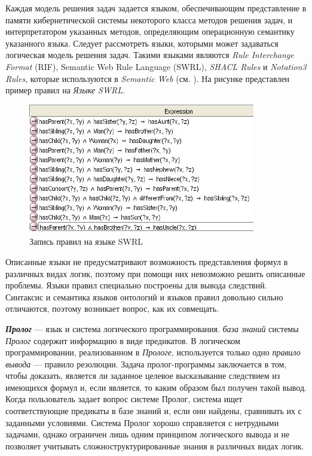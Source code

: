 Каждая модель решения задач задается языком, обеспечивающим представление в памяти кибернетической системы некоторого класса методов решения задач, и интерпретатором указанных методов, определяющим операционную семантику указанного языка. Следует рассмотреть языки, которыми может задаваться логическая модель решения задач. Такими языками являются \textit{Rule Interchange Format} (RIF), Semantic Web Rule Language (SWRL), \textit{SHACL Rules} и \textit{Notation3 Rules}, которые используются в \textit{Semantic Web} (см. ). На рисунке  представлен пример правил на \textit{Языке SWRL}.

\begin{figure}[http]
	\includegraphics[scale=0.8]{author/part3/figures/swrl_example.png}
	\caption{Запись правил на языке SWRL}
	\label{fig:swrl_example}
\end{figure}

Описанные языки не предусматривают возможность представления формул в различных видах логик, поэтому при помощи них невозможно решить описанные проблемы. Языки правил специально построены для вывода следствий. Синтаксис и семантика языков онтологий и языков правил довольно сильно отличаются, поэтому возникает вопрос, как их совмещать. 

\textbf{\textit{Пролог}} --- язык и система логического программирования. \textit{база знаний} системы \textit{Пролог} содержит информацию в виде предикатов. В логическом программировании, реализованном в \textit{Прологе}, используется только одно \textit{правило вывода} --- правило резолюции. Задача пролог-программы заключается в том, чтобы доказать, является ли заданное целевое высказывание следствием из имеющихся формул и, если является, то каким образом был получен такой вывод. Когда пользователь задает вопрос системе Пролог, система ищет соответствующие предикаты в базе знаний и, если они найдены, сравнивать их с заданными условиями. Система Пролог хорошо справляется с нетрудными задачами, однако ограничен лишь одним принципом логического вывода и не позволяет учитывать сложноструктурированные знания в различных видах логик.

